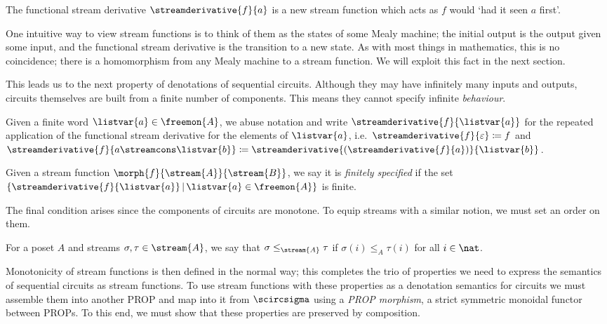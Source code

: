 The functional stream derivative \(\streamderivative{f}{a}\) is a new stream
function which acts as \(f\) would `had it seen \(a\) first'.

\begin{remark}
    One intuitive way to view stream functions is to think of them as the states
    of some Mealy machine; the initial output is the output given some input,
    and the functional stream derivative is the transition to a new state.
    As with most things in mathematics, this is no coincidence; there is a
    homomorphism from any Mealy machine to a stream function.
    We will exploit this fact in the next section.
\end{remark}

This leads us to the next property of denotations of sequential circuits.
Although they may have infinitely many inputs and outputs, circuits themselves
are built from a finite number of components.
This means they cannot specify infinite \emph{behaviour}.

\begin{notation}
    Given a finite word \(\listvar{a} \in \freemon{A}\), we abuse notation
    and write \(\streamderivative{f}{\listvar{a}}\) for the repeated
    application of the functional stream derivative for the elements of
    \(\listvar{a}\), i.e.\ \(
    \streamderivative{f}{\varepsilon} \coloneqq f
    \) and \(
    \streamderivative{f}{a \streamcons \listvar{b}} \coloneqq
    \streamderivative{(\streamderivative{f}{a})}{\listvar{b}}
    \).
\end{notation}

\begin{definition}
    Given a stream function \(\morph{f}{\stream{A}}{\stream{B}}\), we say it is
    \emph{finitely specified} if the set \(\{
    \streamderivative{f}{\listvar{a}} \,|\, \listvar{a} \in \freemon{A}
    \}\) is finite.
\end{definition}

The final condition arises since the components of circuits are monotone.
To equip streams with a similar notion, we must set an order on them.

\begin{notation}
    For a poset \(A\) and streams \(\sigma,\tau \in \stream{A}\), we say that
    \(\sigma \leq_{\stream{A}} \tau\) if \(\sigma(i) \leq_A \tau(i)\) for all
    \(i \in \nat\).
\end{notation}

Monotonicity of stream functions is then defined in the normal way; this
completes the trio of properties we need to express the semantics of
sequential circuits as stream functions.
To use stream functions with these properties as a denotation semantics for
circuits we must assemble them into another PROP and map into it from
\(\scircsigma\) using a \emph{PROP morphism}, a strict symmetric monoidal
functor between PROPs.
To this end, we must show that these properties are preserved by composition.


